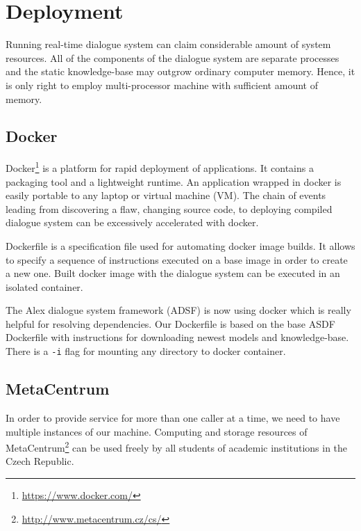 
\section{Deployment}

Running real-time dialogue system can claim considerable amount of system resources.
All of the components of the dialogue system are separate processes and the static knowledge-base may outgrow ordinary computer memory.
Hence, it is only right to employ multi-processor machine with sufficient amount of memory.

\subsection{Docker}

Docker\footnote{\url{https://www.docker.com/}} is a platform for rapid deployment of applications.
It contains a packaging tool and a lightweight runtime.
An application wrapped in docker is easily portable to any laptop or virtual machine (VM).
The chain of events leading from discovering a flaw, changing source code, to deploying compiled dialogue system can be excessively accelerated with docker.

Dockerfile is a specification file used for automating docker image builds.
It allows to specify a sequence of instructions executed on a base image in order to create a new one.
Built docker image with the dialogue system can be executed in an isolated container.

The Alex dialogue system framework (ADSF) is now using docker which is really helpful for resolving dependencies.
Our Dockerfile is based on the base ASDF Dockerfile with instructions for downloading newest models and knowledge-base.
There is a \texttt{-i} flag for mounting any directory to docker container.

\subsection{MetaCentrum}

In order to provide service for more than one caller at a time, we need to have multiple instances of our machine.
Computing and storage resources of MetaCentrum\footnote{\url{http://www.metacentrum.cz/cs/}} can be used freely by all students of academic institutions in the Czech Republic.

